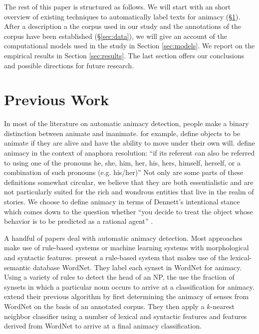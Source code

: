 \documentclass[a4paper,UKenglish]{oasics}
\begin{document}
The rest of this paper is structured as follows. We will start with an
short overview of existing techniques to automatically label texts for
animacy (\S\ref{sec:previous-work}). After a description a the corpus
used in our study and the annotations of the corpus have been
established (\S\ref{sec:data}), we will give an account of the
computational models used in the study in Section \ref{sec:models}. We
report on the empirical results in Section \ref{sec:results}. The last
section offers our conclusions and possible directions for future
research.


\section{Previous Work}\label{sec:previous-work}


In most of the literature on automatic animacy detection, people make
a binary distinction between animate and inanimate. \cite{bowman:12}
for example, define objects to be animate if they are alive and have
the ability to move under their own will. \cite{orasan:07} define
animacy in the context of anaphora resolution: ``if its referent can
also be referred to using one of the pronouns he, she, him, her, his,
hers, himself, herself, or a combination of such pronouns
(e.g. his/her)'' Not only are some parts of these definitions somewhat
circular, we believe that they are both essentialistic and are not
particularly suited for the rich and wondrous entities that live in
the realm of stories. We choose to define animacy in terms of
Dennett's intentional stance which comes down to the question whether
``you decide to treat the object whose behavior is to be predicted as
a rational agent'' \cite[17]{dennett:96}.

A handful of papers deal with automatic animacy detection. Most
approaches make use of rule-based systems or machine learning systems
with morphological and syntactic features. \cite{evans:00} present a
rule-based system that makes use of the lexical-semantic database
WordNet. They label each synset in WordNet for animacy. Using a
variety of rules to detect the head of an NP, the use the fraction of
synsets in which a particular noun occurs to arrive at a
classification for animacy. \cite{orasan:01} extend their previous
algorithm by first determining the animacy of senses from WordNet on
the basis of an annotated corpus. They then apply a $k$-nearest
neighbor classifier using a number of lexical and syntactic features
and features derived from WordNet to arrive at a final animacy
classification.
\end{document}
